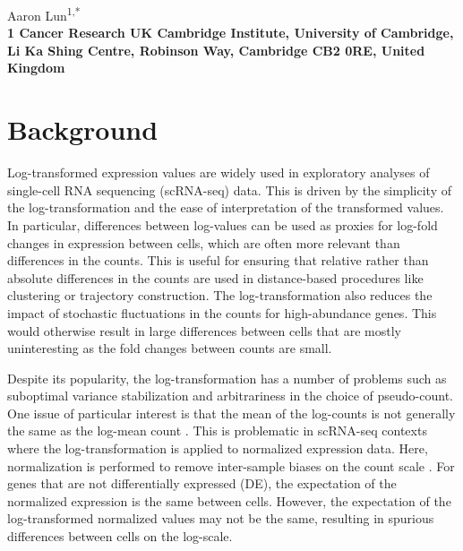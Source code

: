 \documentclass[10pt,letterpaper]{article}
\begin{document}
\vspace*{0.35in}

\begin{flushleft}
{\Large
    \textbf{}
}
\newline

Aaron Lun\textsuperscript{1,*}
\\
\bigskip
\bf{1} Cancer Research UK Cambridge Institute, University of Cambridge, Li Ka Shing Centre, Robinson Way, Cambridge CB2 0RE, United Kingdom \\
\bigskip

\end{flushleft}

\section{Background}
Log-transformed expression values are widely used in exploratory analyses of single-cell RNA sequencing (scRNA-seq) data.
This is driven by the simplicity of the log-transformation and the ease of interpretation of the transformed values.
In particular, differences between log-values can be used as proxies for log-fold changes in expression between cells, which are often more relevant than differences in the counts.
This is useful for ensuring that relative rather than absolute differences in the counts are used in distance-based procedures like clustering or trajectory construction.
The log-transformation also reduces the impact of stochastic fluctuations in the counts for high-abundance genes.
This would otherwise result in large differences between cells that are mostly uninteresting as the fold changes between counts are small.

Despite its popularity, the log-transformation has a number of problems such as suboptimal variance stabilization and arbitrariness in the choice of pseudo-count.
One issue of particular interest is that the mean of the log-counts is not generally the same as the log-mean count \cite{hicks2017missing}.
This is problematic in scRNA-seq contexts where the log-transformation is applied to normalized expression data.
Here, normalization is performed to remove inter-sample biases on the count scale \cite{robinson2010scaling,lun2016pooling}.
For genes that are not differentially expressed (DE), the expectation of the normalized expression is the same between cells.
However, the expectation of the log-transformed normalized values may not be the same, resulting in spurious differences between cells on the log-scale.
\end{document}
